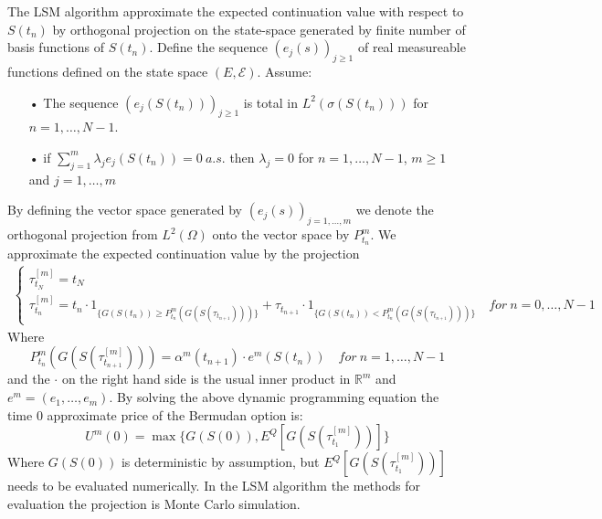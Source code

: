 The LSM algorithm approximate the expected continuation value with respect to $S(t_{n})$ by orthogonal projection on the state-space generated by finite number of basis functions of $S(t_{n})$. Define the sequence $(e_{j}(s))_{j\geq 1}$ of real measureable functions defined on the state space $(E,\mathcal{E})$. Assume:
\begin{enumerate}\label{AssumptionBasisFck}
\item[•] The sequence $(e_{j}(S(t_n)))_{j\geq 1}$ is total in $L^2(\sigma(S(t_n)))$ for $n=1,\ldots,N-1$.
\item[•] if $\sum_{j=1}^{m} \lambda_j e_{j}(S(t_n))=0 \ a.s.$ then $\lambda_j=0$ for $n=1,\ldots,N-1$, $m\geq 1$ and $j=1,\ldots,m$
\end{enumerate}
By defining the vector space generated by $(e_{j}(s))_{j=1, \ldots, m}$ we denote the orthogonal projection from $L^2(\Omega)$ onto the vector space by $P^m_{t_n}$.
We approximate the expected continuation value by the projection
\begin{equation*}\label{LSMDynamic2}
\begin{split}
\begin{cases}
          \tau_{t_N}^{[m]} = t_N\\
          \tau_{t_n}^{[m]} = t_n \cdot 1_{\{G(S(t_n)) \geq P^m_{t_n}(G(S(\tau_{t_{n+1}})))\}} + \tau_{t_{n+1}} \cdot 1_{\{G(S(t_n)) < P^m_{t_n}(G(S(\tau_{t_{n+1}}))) \}} \quad for \ n={0,\ldots,N-1} 
\end{cases}
\end{split}
\end{equation*}
Where
$$P^m_{t_n}(G(S(\tau^{[m]}_{t_{n+1}})))=\alpha^{m}(t_{n+1}) \cdot e^m(S(t_{n})) \quad for \ n=1,\ldots,N-1$$
and the $\cdot$ on the right hand side is the usual inner product in $\mathbb{R}^m$ and $e^m=(e_1,\ldots, e_m)$.
By solving the above dynamic programming equation the time 0 approximate price of the Bermudan option is:
$$U^m(0)=\max \{ G(S(0)), E^Q[G(S(\tau^{[m]}_{t_1}))]\}$$
Where $G(S(0))$ is deterministic by assumption, but $E^Q[G(S(\tau^{[m]}_{t_1}))]$ needs to be evaluated numerically. In the LSM algorithm the methods for evaluation the projection is Monte Carlo simulation.\\


